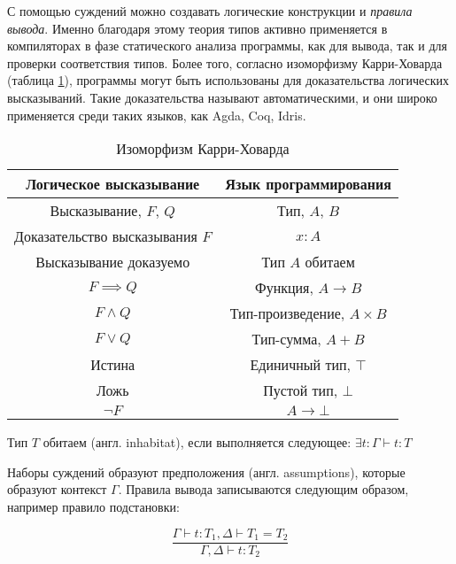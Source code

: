 С помощью суждений можно создавать логические конструкции и \textit{правила вывода}.
Именно благодаря этому теория типов активно применяется в компиляторах в фазе статического анализа программы, как для вывода, так и для проверки соответствия типов.
Более того, согласно изоморфизму Карри-Ховарда~\cite{TypeTheoryArticle} (таблица \ref{tab:curry-hovard-iso}), программы могут быть использованы для доказательства логических высказываний.
Такие доказательства называют автоматическими, и они широко применяется среди таких языков, как Agda, Coq, Idris.

\begin{table}[h]
    \centering
    \caption{Изоморфизм Карри-Ховарда}
    \label{tab:curry-hovard-iso}
    \begin{tabular}{|c|c|}
        \hline
        \textbf{Логическое высказывание} & \textbf{Язык программирования} \\\hline
        Высказывание, $F$, $Q$           & Тип, $A$, $B$                  \\\hline
        Доказательство высказывания $F$  & $x: A$                         \\\hline
        Высказывание доказуемо           & Тип $A$ обитаем                \\\hline
        $F \implies Q$                   & Функция, $A \to B$             \\\hline
        $F \wedge Q$                     & Тип-произведение, $A \times B$ \\\hline
        $F \vee Q$                       & Тип-сумма, $A + B$             \\\hline
        Истина                           & Единичный тип, $\top$          \\\hline
        Ложь                             & Пустой тип, $\bot$             \\\hline
        $\neg F$                         & $A \to \bot$                   \\\hline
    \end{tabular}
\end{table}

Тип $T$ обитаем (англ. inhabitat), если выполняется следующее: $\exists t: \Gamma \vdash t: T$

Наборы суждений образуют предположения (англ. assumptions), которые образуют контекст $\Gamma$.
Правила вывода записываются следующим образом, например правило подстановки:

\begin{equation}
    \label{eq:judgement_substitution}
    \frac{\Gamma \vdash t: T_1, \Delta \vdash T_1 = T_2}{\Gamma, \Delta \vdash t: T_2}
\end{equation}

